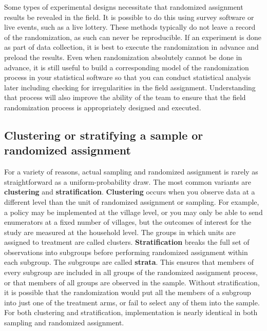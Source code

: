 
Some types of experimental designs necessitate
that randomized assignment results be revealed in the field.
It is possible to do this using survey software or live events, such as a live lottery.
These methods typically do not leave a record of the randomization,
as such can never be reproducible. If an experiment is done as part of data collection,
it is best to execute the randomization in advance and preload the results.
Even when randomization absolutely cannot be done in advance, it is still useful
to build a corresponding model of the randomization process in your statistical software
so that you can conduct statistical analysis later
including checking for irregularities in the field assignment.
Understanding that process will also improve the ability of the team
to ensure that the field randomization process is appropriately designed and executed.


\subsection{Clustering or stratifying a sample or randomized assignment}

For a variety of reasons, actual sampling and randomized assignment
is rarely as straightforward as a uniform-probability draw.
The most common variants are \textbf{clustering} and \textbf{stratification}.\cite{athey2017econometrics}
\textbf{Clustering} occurs when you observe data at a different level
than the unit of randomized assignment or sampling.
For example, a policy may be implemented at the village level,
or you may only be able to send enumerators at a fixed number of villages,
but the outcomes of interest for the study are measured at the household level.
The groups in which units are assigned to treatment are called clusters.
\textbf{Stratification} breaks the full set of observations into subgroups
before performing randomized assignment within each subgroup.
The subgroups are called \textbf{strata}.
This ensures that members of every subgroup
are included in all groups of the randomized assignment process,
or that members of all groups are observed in the sample.
Without stratification, it is possible that the randomization
would put all the members of a subgroup into just one of the treatment arms,
or fail to select any of them into the sample.
For both clustering and stratification,
implementation is nearly identical in both sampling and randomized assignment.

